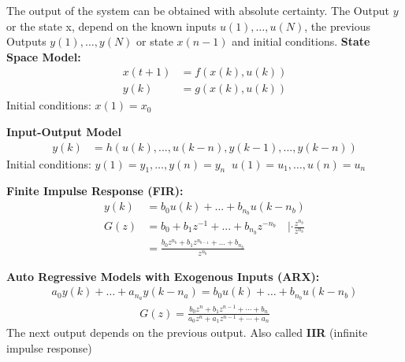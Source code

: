 \begin{tcolorbox}[colback=green!5!white,colframe=green!75!black,title=\textbf{Deterministic Model}]
	The output of the system can be obtained with absolute certainty. The Output $y$ or the state x, depend on the known inputs $u(1), \dots, u(N)$, the previous Outputs $y(1), \dots, y(N)$ or state $x(n-1)$ and initial conditions.  
\textbf{State Space Model: }
\begin{align*}
	 x(t+1) &= f(x(k), u(k)) \\
	y(k) &= g(x(k), u(k)) 
\end{align*}
Initial conditions: $x(1) = x_0$

\textbf{Input-Output Model}
\begin{align*}
y(k) &= h(u(k), ..., u(k-n), y(k-1), ..., y(k-n))
\end{align*}
Initial conditions: $y(1) = y_1,\dots,y(n) = y_n  \;\; u(1)= u_1,\dots,u(n) = u_n$

\textbf{Finite Impulse Response (FIR): } 
\begin{align*}
	y(k) &= b_0 u(k) + ... + b_{n_b} u(k-n_b) \\
	G(z) &= b_0 + b_1z^{-1} + ... + b_{n_b}z^{-n_b} \quad | \cdot \frac{z^{n_b}}{z^{n_b}} \\
	&= \frac{b_0 z^{n_b} + b_1 z^{ n_{b-1} } + ... + b_{n_b} }{z^{n_b}}
\end{align*}

\textbf{Auto Regressive Models with Exogenous Inputs (ARX): }
\begin{align*}
	a_0y(k)+\dots+a_{n_a}y(k-n_a) = b_0u(k) + \dots+b_{n_b}u(k-n_b)
\end{align*}
\begin{align*}
G(z) = \frac{b_0z^n + b_1z^{n-1} + \cdots + b_n}{a_0z^n + a_1z^{n-1} + \cdots + a_n}
\end{align*}
The next output depends on the previous output. Also called \textbf{IIR} (infinite impulse response)

\end{tcolorbox}		
